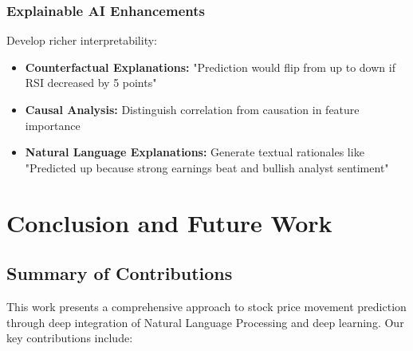 \documentclass[conference]{IEEEtran}
\begin{document}
\subsubsection{Explainable AI Enhancements}
Develop richer interpretability:

\begin{itemize}
\item \textbf{Counterfactual Explanations:} "Prediction would flip from up to down if RSI decreased by 5 points"
\item \textbf{Causal Analysis:} Distinguish correlation from causation in feature importance
\item \textbf{Natural Language Explanations:} Generate textual rationales like "Predicted up because strong earnings beat and bullish analyst sentiment"
\end{itemize}

\section{Conclusion and Future Work}

\subsection{Summary of Contributions}

This work presents a comprehensive approach to stock price movement prediction through deep integration of Natural Language Processing and deep learning. Our key contributions include:
\end{document}
